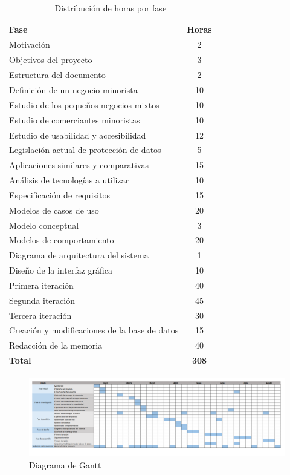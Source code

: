 \begin{table}[h!]
	\centering
	\begin{tabular}{|l|c|}
		\hline
		\textbf{Fase} & \textbf{Horas} \\ \hline
		Motivación & 2 \\ \hline
		Objetivos del proyecto & 3 \\ \hline
		Estructura del documento & 2 \\ \hline
		Definición de un negocio minorista & 10 \\ \hline
		Estudio de los pequeños negocios mixtos & 10 \\ \hline
		Estudio de comerciantes minoristas & 10 \\ \hline
		Estudio de usabilidad y accesibilidad & 12 \\ \hline
		Legislación actual de protección de datos & 5 \\ \hline
		Aplicaciones similares y comparativas & 15 \\ \hline
		Análisis de tecnologías a utilizar & 10 \\ \hline
		Especificación de requisitos & 15 \\ \hline
		Modelos de casos de uso & 20 \\ \hline
		Modelo conceptual & 3 \\ \hline
		Modelos de comportamiento & 20 \\ \hline
		Diagrama de arquitectura del sistema & 1 \\ \hline
		Diseño de la interfaz gráfica & 10 \\ \hline
		Primera iteración & 40 \\ \hline
		Segunda iteración & 45 \\ \hline
		Tercera iteración & 30 \\ \hline
		Creación y modificaciones de la base de datos & 15 \\ \hline
		Redacción de la memoria & 40 \\ \hline
		\textbf{Total} & \textbf{308} \\ \hline
	\end{tabular}
	\caption{Distribución de horas por fase}
	\label{tabla:resumen}
\end{table}



\newpage

\begin{figure}[H]
	\centering
	\includegraphics[width=1.6\textwidth, angle=90]{imagenes/imagenesDiagramas/diagramaGantt.png}
	\caption{Diagrama de Gantt}
	\label{fig:diagramaGantt}
\end{figure}




